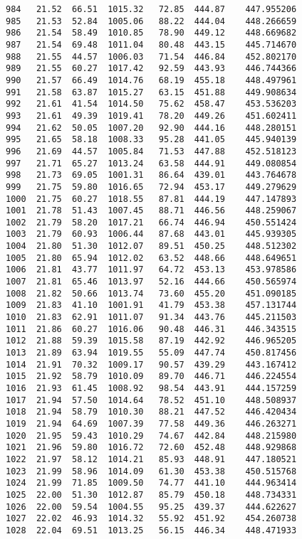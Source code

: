 \documentclass[11pt]{article}
\begin{document}
\begin{tcolorbox}[breakable, size=fbox, boxrule=.5pt, pad at break*=1mm, opacityfill=0]
\begin{Verbatim}[commandchars=\\\{\}]
984   21.52  66.51  1015.32   72.85  444.87    447.955206
985   21.53  52.84  1005.06   88.22  444.04    448.266659
986   21.54  58.49  1010.85   78.90  449.12    448.669682
987   21.54  69.48  1011.04   80.48  443.15    445.714670
988   21.55  44.57  1006.03   71.54  446.84    452.802170
989   21.55  60.27  1017.42   92.59  443.93    446.744366
990   21.57  66.49  1014.76   68.19  455.18    448.497961
991   21.58  63.87  1015.27   63.15  451.88    449.908634
992   21.61  41.54  1014.50   75.62  458.47    453.536203
993   21.61  49.39  1019.41   78.20  449.26    451.602411
994   21.62  50.05  1007.20   92.90  444.16    448.280151
995   21.65  58.18  1008.33   95.28  441.05    445.940139
996   21.69  44.57  1005.84   71.53  447.88    452.518123
997   21.71  65.27  1013.24   63.58  444.91    449.080854
998   21.73  69.05  1001.31   86.64  439.01    443.764678
999   21.75  59.80  1016.65   72.94  453.17    449.279629
1000  21.75  60.27  1018.55   87.81  444.19    447.147893
1001  21.78  51.43  1007.45   88.71  446.56    448.259067
1002  21.79  58.20  1017.21   66.74  446.94    450.551424
1003  21.79  60.93  1006.44   87.68  443.01    445.939305
1004  21.80  51.30  1012.07   89.51  450.25    448.512302
1005  21.80  65.94  1012.02   63.52  448.66    448.649651
1006  21.81  43.77  1011.97   64.72  453.13    453.978586
1007  21.81  65.46  1013.97   52.16  444.66    450.565974
1008  21.82  50.66  1013.74   73.60  455.20    451.090185
1009  21.83  41.10  1001.91   41.79  453.38    457.131744
1010  21.83  62.91  1011.07   91.34  443.76    445.211503
1011  21.86  60.27  1016.06   90.48  446.31    446.343515
1012  21.88  59.39  1015.58   87.19  442.92    446.965205
1013  21.89  63.94  1019.55   55.09  447.74    450.817456
1014  21.91  70.32  1009.17   90.57  439.29    443.167412
1015  21.92  58.79  1010.09   89.70  446.71    446.224554
1016  21.93  61.45  1008.92   98.54  443.91    444.157259
1017  21.94  57.50  1014.64   78.52  451.10    448.508937
1018  21.94  58.79  1010.30   88.21  447.52    446.420434
1019  21.94  64.69  1007.39   77.58  449.36    446.263271
1020  21.95  59.43  1010.29   74.67  442.84    448.215980
1021  21.96  59.80  1016.72   72.60  452.48    448.929868
1022  21.97  58.12  1014.21   85.93  448.91    447.180521
1023  21.99  58.96  1014.09   61.30  453.38    450.515768
1024  21.99  71.85  1009.50   74.77  441.10    444.963414
1025  22.00  51.30  1012.87   85.79  450.18    448.734331
1026  22.00  59.54  1004.55   95.25  439.37    444.622627
1027  22.02  46.93  1014.32   55.92  451.92    454.260738
1028  22.04  69.51  1013.25   56.15  446.34    448.471933

\end{Verbatim}
\end{tcolorbox}
\end{document}

